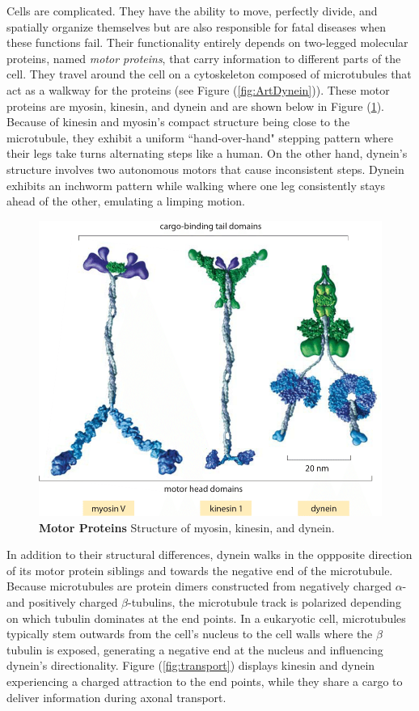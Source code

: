 Cells are complicated. They have the ability to move, perfectly divide, and spatially organize themselves but are also responsible for fatal diseases when these functions fail. Their functionality entirely depends on two-legged molecular proteins, named \textit{motor proteins}, that carry information to different parts of the cell. They travel around the cell on a cytoskeleton composed of microtubules that act as a walkway for the proteins (see Figure (\ref{fig:ArtDynein})). These motor proteins are myosin, kinesin, and dynein and are shown below in Figure (\ref{fig:Compare}). Because of kinesin and myosin's compact structure being close to the microtubule, they exhibit a uniform ``hand-over-hand" stepping pattern where their legs take turns alternating steps like a human. On the other hand, dynein's structure involves two autonomous motors that cause inconsistent steps. Dynein exhibits an inchworm pattern while walking where one leg consistently stays ahead of the other, emulating a limping motion.

\begin{figure}[H]
	\centering
	\includegraphics[width=0.4\columnwidth]{Figures/motor_comparison.png}
	\caption[Motor Proteins]{\textbf{Motor Proteins} Structure of myosin, kinesin, and dynein. \cite{JohnsonArt}}
	\label{fig:Compare}
\end{figure}

In addition to their structural differences, dynein walks in the oppposite direction of its motor protein siblings and towards the negative end of the microtubule. Because microtubules are protein dimers constructed from negatively charged $\alpha$- and positively charged $\beta$-tubulins, the microtubule track is polarized depending on which tubulin dominates at the end points. In a eukaryotic cell, microtubules typically stem outwards from the cell's nucleus to the cell walls where the $\beta$ tubulin is exposed, generating a negative end at the nucleus and influencing dynein's directionality. Figure (\ref{fig:transport}) displays kinesin and dynein experiencing a charged attraction to the end points, while they share a cargo to deliver information during axonal transport. 

